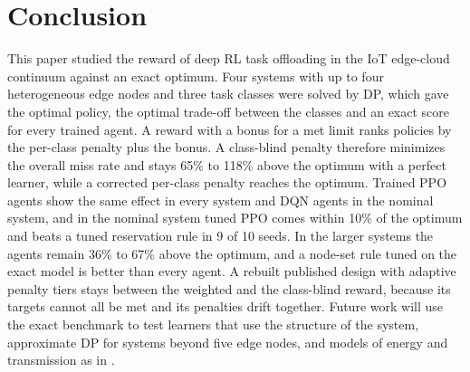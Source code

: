 \section{Conclusion}
\label{sec:conclusion}

This paper studied the reward of deep RL task offloading in the IoT edge-cloud continuum against an exact optimum. Four systems with up to four heterogeneous edge nodes and three task classes were solved by DP, which gave the optimal policy, the optimal trade-off between the classes and an exact score for every trained agent. A reward with a bonus for a met limit ranks policies by the per-class penalty plus the bonus. A class-blind penalty therefore minimizes the overall miss rate and stays 65\% to 118\% above the optimum with a perfect learner, while a corrected per-class penalty reaches the optimum. Trained PPO agents show the same effect in every system and DQN agents in the nominal system, and in the nominal system tuned PPO comes within 10\% of the optimum and beats a tuned reservation rule in 9 of 10 seeds. In the larger systems the agents remain 36\% to 67\% above the optimum, and a node-set rule tuned on the exact model is better than every agent. A rebuilt published design with adaptive penalty tiers stays between the weighted and the class-blind reward, because its targets cannot all be met and its penalties drift together. Future work will use the exact benchmark to test learners that use the structure of the system, approximate DP for systems beyond five edge nodes, and models of energy and transmission as in \cite{hu2021,zhang2024}.
